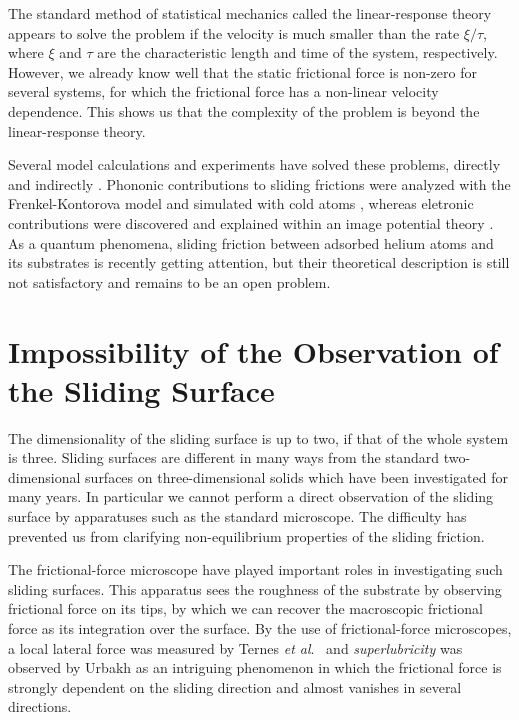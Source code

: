 The standard method of statistical mechanics called the linear-response theory appears to solve the problem if the velocity is much smaller than the rate $\xi/\tau$, where $\xi$ and $\tau$ are the characteristic length and time of the system, respectively. However, we already know well that the static frictional force is non-zero for several systems, for which the frictional force has a non-linear velocity dependence. This shows us that the complexity of the problem is beyond the linear-response theory.

Several model calculations and experiments have solved these problems, directly \cite{Weiss1996,Weiss1997,Garcia-Mata2007,Meyer2015,Bylinskii2016,Novotny1999,Hosomi2007,Hosomi2008,Hosomi2009,Ternes2008,Urbakh2010,Kim2007,Grierson2007,Manini2017,Kadau2008,Magiera2011,Wolter2012,Hucht2009b} and indirectly \cite{Strunz1998a,Strunz1998,Novaco2015b,Meng2015}. Phononic contributions to sliding frictions were analyzed with the Frenkel-Kontorova model \cite{Weiss1996,Weiss1997,Strunz1998a,Strunz1998,Novaco2015b,Meng2015} and simulated with cold atoms \cite{Garcia-Mata2007,Meyer2015,Bylinskii2016}, whereas eletronic contributions were discovered \cite{Dayo1998} and explained within an image potential theory \cite{Novotny1999}. As a quantum phenomena, sliding friction between adsorbed helium atoms and its substrates \cite{Hosomi2007,Hosomi2008,Hosomi2009} is recently getting attention, but their theoretical description is still not satisfactory and remains to be an open problem.

\section{Impossibility of the Observation of the Sliding Surface}\label{sec:IMPObsSlSf}
The dimensionality of the sliding surface is up to two, if that of the whole system is three. Sliding surfaces are different in many ways from the standard two-dimensional surfaces on three-dimensional solids which have been investigated for many years. In particular we cannot perform a direct observation of the sliding surface by apparatuses such as the standard microscope. The difficulty has prevented us from clarifying non-equilibrium properties of the sliding friction.

The frictional-force microscope have played important roles in investigating such sliding surfaces. This apparatus sees the roughness of the substrate by observing frictional force on its tips, by which we can recover the macroscopic frictional force as its integration over the surface. By the use of frictional-force microscopes, a local lateral force was measured by Ternes \textit{et al}.\ \cite{Ternes2008} and \textit{superlubricity} was observed by Urbakh \cite{Urbakh2010} as an intriguing phenomenon in which the frictional force is strongly dependent on the sliding direction and almost vanishes in several directions.

